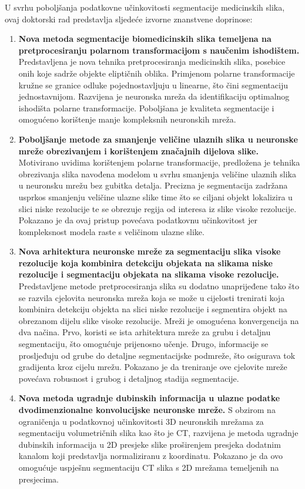 U svrhu poboljšanja podatkovne učinkovitosti segmentacije medicinskih slika, ovaj doktorski rad predstavlja sljedeće izvorne znanstvene doprinose:

\begin{enumerate}
	\item \textbf{Nova metoda segmentacije biomedicinskih slika temeljena na pretprocesiranju polarnom transformacijom s naučenim ishodištem.} Predstavljena je nova tehnika pretprocesiranja medicinskih slika, posebice onih koje sadrže objekte eliptičnih oblika. Primjenom polarne transformacije kružne se granice odluke pojednostavljuju u linearne, što čini segmentaciju jednostavnijom. Razvijena je neuronska mreža da identifikaciju optimalnog ishodišta polarne transformacije. Poboljšana je kvaliteta segmentacije i omogućeno korištenje manje kompleksnih neuronskih mreža.
	\item \textbf{Poboljšanje metode za smanjenje veličine ulaznih slika u neuronske mreže obrezivanjem i korištenjem značajnih dijelova slike.} Motivirano uvidima korištenjem polarne transformacije, predložena je tehnika obrezivanja slika navođena modelom u svrhu smanjenja veličine ulaznih slika u neuronsku mrežu bez gubitka detalja. Precizna je segmentacija zadržana usprkos smanjenju veličine ulazne slike time što se ciljani objekt lokalizira u slici niske rezolucije te se obrezuje regija od interesa iz slike visoke rezolucije. Pokazano je da ovaj pristup povećava podatkovnu učinkovitost jer kompleksnost modela raste s veličinom ulazne slike.
	\item \textbf{Nova arhitektura neuronske mreže za segmentaciju slika visoke rezolucije koja kombinira detekciju objekata na slikama niske rezolucije i segmentaciju objekata na slikama visoke rezolucije.} Predstavljene metode pretprocesiranja slika su dodatno unaprijeđene tako što se razvila cjelovita neuronska mreža koja se može u cijelosti trenirati koja kombinira detekciju objekta na slici niske rezolucije i segmentira objekt na obrezanom dijelu slike visoke rezolucije. Mreži je omogućena konvergencija na dva načina. Prvo, koristi se ista arhitektura mreže za grubu i detaljnu segmentaciju, što omogućuje prijenosno učenje. Drugo, informacije se prosljeđuju od grube do detaljne segmentacijske podmreže, što osigurava tok gradijenta kroz cijelu mrežu. Pokazano je da treniranje ove cjelovite mreže povećava robusnost i grubog i detaljnog stadija segmentacije.
	\item \textbf{Nova metoda ugradnje dubinskih informacija u ulazne podatke dvodimenzionalne konvolucijske neuronske mreže.} S obzirom na ograničenja u podatkovnoj učinkovitosti 3D neuronskih mrežama za segmentaciju volumetričnih slika kao što je CT, razvijena je metoda ugradnje dubinskih informacija u 2D presjeke slike proširenjem presjeka dodatnim kanalom koji predstavlja normaliziranu z koordinatu. Pokazano je da ovo omogućuje uspješnu segmentaciju CT slika s 2D mrežama temeljenih na presjecima.
\end{enumerate}

